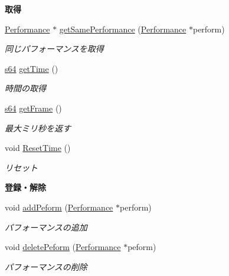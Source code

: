 \begin{Indent}{\bf 取得}\par
\begin{DoxyCompactItemize}
\item 
\hyperlink{class_performance}{Performance} $\ast$ \hyperlink{class_performance_manager_abd6eca627b1039cc37dbba62f89108b0}{get\-Same\-Performance} (\hyperlink{class_performance}{Performance} $\ast$perform)
\begin{DoxyCompactList}\small\item\em 同じパフォーマンスを取得 \end{DoxyCompactList}\item 
\hyperlink{_main_8h_a4258bfb2c3a440d06c4aaa3c2b450dde}{s64} \hyperlink{class_performance_manager_add8bf4ce9d5b98f0b36ac2058110a433}{get\-Time} ()
\begin{DoxyCompactList}\small\item\em 時間の取得 \end{DoxyCompactList}\item 
\hyperlink{_main_8h_a4258bfb2c3a440d06c4aaa3c2b450dde}{s64} \hyperlink{class_performance_manager_a0e7f63cfa3d827ddceffa85c5f1ee608}{get\-Frame} ()
\begin{DoxyCompactList}\small\item\em 最大ミリ秒を返す \end{DoxyCompactList}\item 
void \hyperlink{class_performance_manager_adf1f1bf9975598ca488a85938edd64e0}{Reset\-Time} ()
\begin{DoxyCompactList}\small\item\em リセット \end{DoxyCompactList}\end{DoxyCompactItemize}
\end{Indent}
\begin{Indent}{\bf 登録・解除}\par
\begin{DoxyCompactItemize}
\item 
void \hyperlink{class_performance_manager_ab6a18694c8553a1b3b031e59c6678b1a}{add\-Peform} (\hyperlink{class_performance}{Performance} $\ast$perform)
\begin{DoxyCompactList}\small\item\em パフォーマンスの追加 \end{DoxyCompactList}\item 
void \hyperlink{class_performance_manager_af413f574ffacb77125f1a9223f6c9fc8}{delete\-Peform} (\hyperlink{class_performance}{Performance} $\ast$peform)
\begin{DoxyCompactList}\small\item\em パフォーマンスの削除 \end{DoxyCompactList}\end{DoxyCompactItemize}
\end{Indent}
